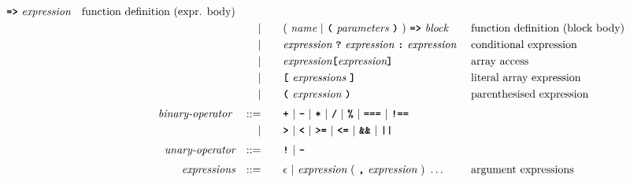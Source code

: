 \begin{alignat*}{9}
                                            \texttt{\textbf{=>}}\ \textit{expression}
                                                           && \textrm{function definition (expr. body)}\\
&&                       && |   &\quad &&   (\ \textit{name}\ | \
                                               \textbf{\texttt{(}}\ \textit{parameters}\ \textbf{\texttt{)}}\
                                            )\    
                                            \texttt{\textbf{=>}}\ \textit{block}
                                                           && \textrm{function definition (block body)}\\
&&                       && |   &\quad &&   \textit{expression} \ \textbf{\texttt{?}}\ 
                                            \textit{expression}
                                            \ \textbf{\texttt{:}}\
                                            \textit{expression}\
                                                           && \textrm{conditional expression}\\
&&                       && |   &\quad && \textit{expression} \textbf{\texttt{[}}
                                          \textit{expression} \textbf{\texttt{]}}
                                                           && \textrm{array access} \\
&&                       && |   &\quad &&   \textbf{\texttt{[}}\ 
                                            \textit{expressions}\
                                            \textbf{\texttt{]}}
                                                           && \textrm{literal array expression}\\
&&                       && |   &\quad &&  \textbf{\texttt{(}}\  \textit{expression} \ 
                                            \textbf{\texttt{)}} && \textrm{parenthesised expression}\\[1mm]
&& \textit{binary-operator}    \ 
                        && ::= &\quad && \textbf{\texttt{+}}\ |\ \textbf{\texttt{-}}\ |\ \textbf{\texttt{*}}\ |\ \textbf{\texttt{/}}\ |\ \textbf{\texttt{\%}}\ |\ 
                                   \textbf{\texttt{===}}\ |\ \textbf{\texttt{!==}}\ \\
&&                       && |  &\quad &&  \texttt{\textbf{>}}\ |\ \texttt{\textbf{<}}\ |\ \texttt{\textbf{>=}}\ |\ \texttt{\textbf{<=}}\
                                          |\ \textbf{\texttt{\&\&}}\ |\ \texttt{\textbf{||}}\  \\[1mm]
&& \textit{unary-operator}    
                        && ::= &\quad && \textbf{\texttt{!}}\ |\ \textbf{\texttt{-}}\\[1mm]
&& \textit{expressions}  && ::= &\quad && \epsilon\ | \ \textit{expression}\ (
                                                               \ \textbf{\texttt{,}} \
                                                                 \textit{expression} \ 
                                                                      )\ \ldots
                                                            && \textrm{argument expressions}
\end{alignat*}

